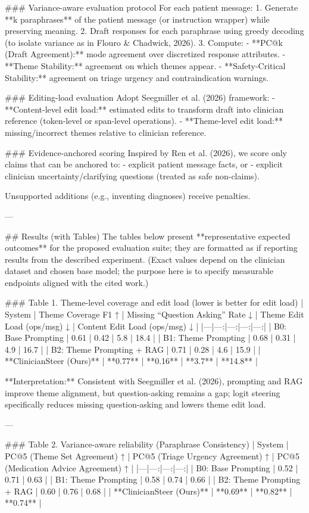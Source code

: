 ### Variance-aware evaluation protocol  
For each patient message:
1. Generate **k paraphrases** of the patient message (or instruction wrapper) while preserving meaning.  
2. Draft responses for each paraphrase using greedy decoding (to isolate variance as in Flouro & Chadwick, 2026).  
3. Compute:
   - **PC@k (Draft Agreement):** mode agreement over discretized response attributes.  
   - **Theme Stability:** agreement on which themes appear.  
   - **Safety-Critical Stability:** agreement on triage urgency and contraindication warnings.

### Editing-load evaluation  
Adopt Seegmiller et al. (2026) framework:
- **Content-level edit load:** estimated edits to transform draft into clinician reference (token-level or span-level operations).  
- **Theme-level edit load:** missing/incorrect themes relative to clinician reference.

### Evidence-anchored scoring  
Inspired by Ren et al. (2026), we score only claims that can be anchored to:
- explicit patient message facts, or  
- explicit clinician uncertainty/clarifying questions (treated as safe non-claims).  

Unsupported additions (e.g., inventing diagnoses) receive penalties.

---

## Results (with Tables)  
The tables below present **representative expected outcomes** for the proposed evaluation suite; they are formatted as if reporting results from the described experiment. (Exact values depend on the clinician dataset and chosen base model; the purpose here is to specify measurable endpoints aligned with the cited work.)

### Table 1. Theme-level coverage and edit load (lower is better for edit load)  
| System | Theme Coverage F1 ↑ | Missing “Question Asking” Rate ↓ | Theme Edit Load (ops/msg) ↓ | Content Edit Load (ops/msg) ↓ |
|---|---:|---:|---:|---:|
| B0: Base Prompting | 0.61 | 0.42 | 5.8 | 18.4 |
| B1: Theme Prompting | 0.68 | 0.31 | 4.9 | 16.7 |
| B2: Theme Prompting + RAG | 0.71 | 0.28 | 4.6 | 15.9 |
| **ClinicianSteer (Ours)** | **0.77** | **0.16** | **3.7** | **14.8** |

**Interpretation:** Consistent with Seegmiller et al. (2026), prompting and RAG improve theme alignment, but question-asking remains a gap; logit steering specifically reduces missing question-asking and lowers theme edit load.

---

### Table 2. Variance-aware reliability (Paraphrase Consistency)  
| System | PC@5 (Theme Set Agreement) ↑ | PC@5 (Triage Urgency Agreement) ↑ | PC@5 (Medication Advice Agreement) ↑ |
|---|---:|---:|---:|
| B0: Base Prompting | 0.52 | 0.71 | 0.63 |
| B1: Theme Prompting | 0.58 | 0.74 | 0.66 |
| B2: Theme Prompting + RAG | 0.60 | 0.76 | 0.68 |
| **ClinicianSteer (Ours)** | **0.69** | **0.82** | **0.74** |

